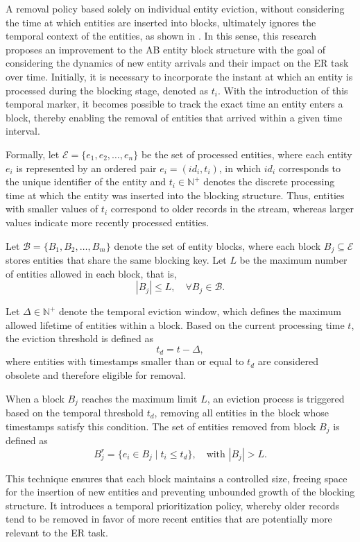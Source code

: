 \documentclass{ieeeaccess}
\begin{document}
A removal policy based solely on individual entity eviction, without considering the time at which entities are inserted into blocks, ultimately ignores the temporal context of the entities, as shown in \cite{10.1109/TKDE.2024.3361022}. In this sense, this research proposes an improvement to the AB entity block structure with the goal of considering the dynamics of new entity arrivals and their impact on the ER task over time. Initially, it is necessary to incorporate the instant at which an entity is processed during the blocking stage, denoted as $t_i$. With the introduction of this temporal marker, it becomes possible to track the exact time an entity enters a block, thereby enabling the removal of entities that arrived within a given time interval.

Formally, let \( \mathcal{E} = \{e_1, e_2, \dots, e_n\} \) be the set of processed entities, where each entity \( e_i \) is represented by an ordered pair \( e_i = (id_i, t_i) \), in which \( id_i \) corresponds to the unique identifier of the entity and \( t_i \in \mathbb{N}^{+} \) denotes the discrete processing time at which the entity was inserted into the blocking structure. Thus, entities with smaller values of \( t_i \) correspond to older records in the stream, whereas larger values indicate more recently processed entities.

Let \( \mathcal{B} = \{B_1, B_2, \dots, B_m\} \) denote the set of entity blocks, where each block \( B_j \subseteq \mathcal{E} \) stores entities that share the same blocking key. Let \( L \) be the maximum number of entities allowed in each block, that is,
\[
|B_j| \leq L, \quad \forall B_j \in \mathcal{B}.
\]

Let \( \Delta \in \mathbb{N}^{+} \) denote the temporal eviction window, which defines the maximum allowed lifetime of entities within a block. Based on the current processing time \( t \), the eviction threshold is defined as
\[
t_d = t - \Delta,
\]
where entities with timestamps smaller than or equal to \( t_d \) are considered obsolete and therefore eligible for removal.

When a block \( B_j \) reaches the maximum limit \( L \), an eviction process is triggered based on the temporal threshold \( t_d \), removing all entities in the block whose timestamps satisfy this condition. The set of entities removed from block \( B_j \) is defined as
\[
B_{j}^{r} =
\{ e_i \in B_j \mid t_i \leq t_d \},
\quad \text{with } |B_j| > L.
\]

This technique ensures that each block maintains a controlled size, freeing space for the insertion of new entities and preventing unbounded growth of the blocking structure. It introduces a temporal prioritization policy, whereby older records tend to be removed in favor of more recent entities that are potentially more relevant to the ER task.
\end{document}
